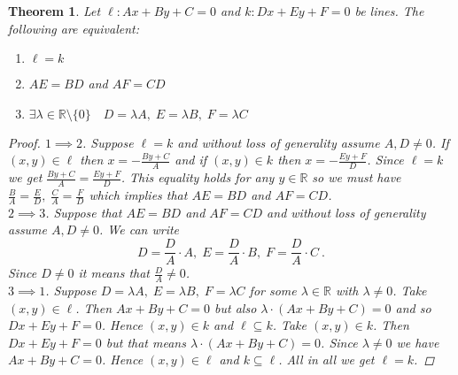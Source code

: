\documentclass[a4paper,12pt]{report}
\newtheorem{theorem}{Theorem}
\begin{document}
\begin{theorem}\label{Equality of Lines}
  Let $\ell:Ax+By+C=0$ and $k:Dx+Ey+F=0$ be lines. The following are equivalent:
  \begin{enumerate}
    \item $\ell=k$
    \item $AE=BD$  and $AF=CD$
    \item $\exists\lambda\in\mathbb{R}\setminus\{0\}\quad D=\lambda A,\; E=\lambda B,\; F=\lambda C$
  \end{enumerate}
\begin{proof}
  $1\implies 2$. Suppose $\ell=k$ and without loss of generality assume $A,D\ne 0$. If $(x,y)\in \ell$ then $x=-\frac{By+C}{A}$ and if $(x,y)\in k$ then $x=-\frac{Ey+F}{D}$. Since $\ell=k$ we get $\frac{By+C}{A}=\frac{Ey+F}{D}$. This equality holds for any $y\in\mathbb{R}$ so we must have $\frac{B}{A}=\frac{E}{D}, \; \frac{C}{A}=\frac{F}{D}$ which implies that $AE=BD$ and $AF=CD$.\\
  $2\implies 3$. Suppose that $AE=BD$ and $AF=CD$ and without loss of generality assume $A,D\ne 0$. We can write
  \[
    D=\frac{D}{A}\cdot A, \; E=\frac{D}{A}\cdot B, \; F=\frac{D}{A}\cdot C ~.
  \]
  Since $D\ne 0$ it means that $\frac{D}{A}\ne 0$. \\
  $3\implies 1$. Suppose $D=\lambda A,\; E=\lambda B,\; F=\lambda C$ for some $\lambda\in\mathbb{R}$ with $\lambda\ne 0$. Take $(x,y)\in \ell$. Then $Ax+By+C=0$ but also $\lambda\cdot (Ax+By+C)=0$ and so $Dx+Ey+F=0$. Hence $(x,y)\in k$ and $\ell\subseteq k$. Take $(x,y)\in k$. Then $Dx+Ey+F=0$ but that means $\lambda\cdot (Ax+By+C)=0$. Since $\lambda\ne 0$ we have $Ax+By+C=0$. Hence $(x,y)\in \ell$ and $k\subseteq \ell$. All in all we get $\ell=k$.
\end{proof}
\end{theorem}
\end{document}
